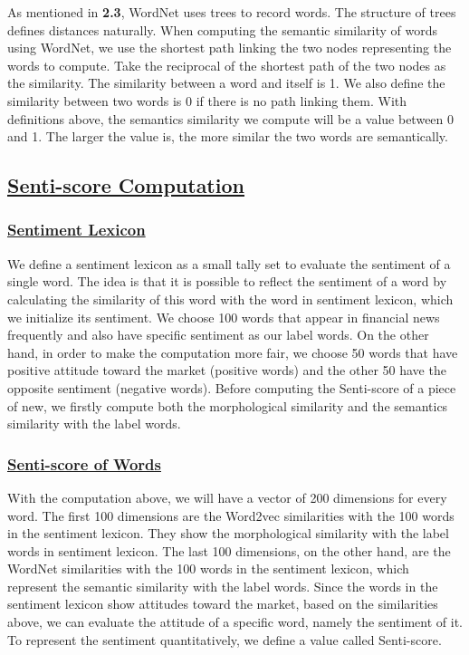 \documentclass[10pt, conference, compsocconf]{IEEEtran}
\begin{document}
As mentioned in \textbf{2.3}, WordNet uses trees to record words. The structure of trees defines distances naturally. When computing the semantic similarity of words using WordNet, we use the shortest path linking the two nodes representing the words to compute. Take the reciprocal of the shortest path of the two nodes as the similarity. The similarity between a word and itself is 1. We also define the similarity between two words is 0 if there is no path linking them. With definitions above, the semantics similarity we compute will be a value between 0 and 1. The larger the value is, the more similar the two words are semantically.

\subsection{\underline{Senti-score Computation}}
\subsubsection{\underline{Sentiment Lexicon}}

We define a sentiment lexicon as a small tally set to evaluate the sentiment of a single word. The idea is that it is possible to reflect the sentiment of a word by calculating the similarity of this word with the word in sentiment lexicon, which we initialize its sentiment. We choose 100 words that appear in financial news frequently and also have specific sentiment as our label words. On the other hand, in order to make the computation more fair, we choose 50 words that have positive attitude toward the market (positive words) and the other 50 have the opposite sentiment (negative words). Before computing the Senti-score of a piece of new, we firstly compute both the morphological similarity and the semantics similarity with the label words.

\subsubsection{\underline{Senti-score of Words}}
With the computation above, we will have a vector of 200 dimensions for every word. The first 100 dimensions are the Word2vec similarities with the 100 words in the sentiment lexicon. They show the morphological similarity with the label words in sentiment lexicon. The last 100 dimensions, on the other hand, are the WordNet similarities with the 100 words in the sentiment lexicon, which represent the semantic similarity with the label words. Since the words in the sentiment lexicon show attitudes toward the market, based on the similarities above, we can evaluate the attitude of a specific word, namely the sentiment of it. To represent the sentiment quantitatively, we define a value called Senti-score.
\end{document}
